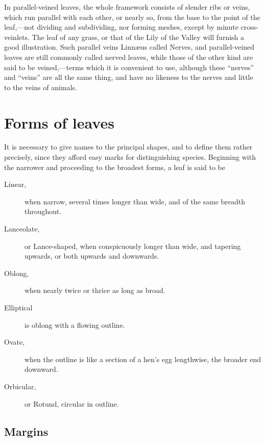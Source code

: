 \documentclass[11pt,twoside]{article}
\begin{document}
In parallel-veined leaves, the whole framework consists of slender ribs or
veins, which run parallel with each other, or nearly so, from the base to
the point of the leaf,---not dividing and subdividing, nor forming meshes,
except by minute cross-veinlets. The leaf of any grass, or that of the Lily
of the Valley will furnish a good illustration. Such parallel veins
Linn\ae us called Nerves, and parallel-veined leaves are still commonly
called nerved leaves, while those of the other kind are said to be
veined,---terms which it is convenient to use, although these ``nerves''
and ``veins'' are all the same thing, and have no likeness to the nerves and
little to the veins of animals.

\section{Forms of leaves}

It is necessary to give names to the principal shapes, and to define them
rather precisely, since they afford easy marks for distinguishing species.
Beginning with the narrower and proceeding to the broadest forms, a leaf is
said to be

\begin{description}
\item[Linear,] when narrow, several times longer than wide, and of the same
  breadth throughout.
\item[Lanceolate,] or Lance-shaped, when conspicuously longer than wide,
  and tapering upwards, or both upwards and downwards.
\item[Oblong,] when nearly twice or thrice as long as broad.
\item[Elliptical] is oblong with a flowing outline.
\item[Ovate,] when the outline is like a section of a hen's egg
  lengthwise, the broader end downward.
\item[Orbicular,] or Rotund, circular in outline.
\end{description}


\subsection{Margins}
\end{document}
